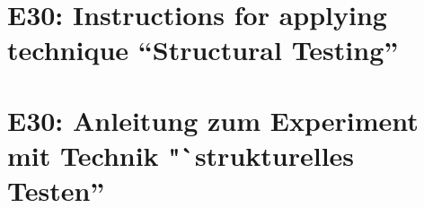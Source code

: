 
\ifenglish
\section*{E30: Instructions for applying technique ``Structural Testing''}

\fi
\ifgerman
\section*{E30: Anleitung zum Experiment mit Technik "`strukturelles Testen''}

\fi

